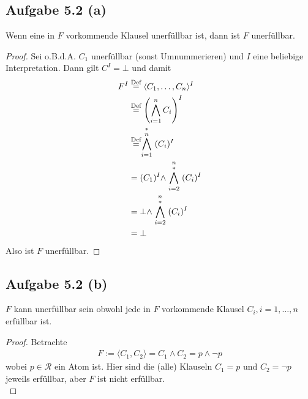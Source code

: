 \documentclass[12pt,a4paper]{article}
\newcommand{\RR}{\mathcal{R}}
\begin{document}
\subsection*{Aufgabe 5.2 (a)}
Wenn eine in $F$ vorkommende Klausel unerfüllbar ist, dann ist $F$ unerfüllbar.
\begin{proof}
Sei o.B.d.A. $C_1$ unerfüllbar (sonst Umnummerieren) und $I$ eine beliebige Interpretation. Dann gilt $C^I=\bot$ und damit
\begin{align*}
F^I
&\stackrel{\text{Def}}{=}
\langle C_1,\ldots,C_n\rangle^I\\
&\stackrel{\text{Def}}{=}
\left(\bigwedge\limits_{i=1}^n C_i\right)^I\\
&\stackrel{\text{Def}}{=}
\stackrel{\ast}{\bigwedge\limits_{i=1}^n} (C_i)^I\\
&=(C_1)^I\wedge \stackrel{n}{\bigwedge\limits_{i=2}^\ast} (C_i)^I\\
&=\bot\wedge \stackrel{n}{\bigwedge\limits_{i=2}^\ast} (C_i)^I\\
&=\bot
\end{align*}
Also ist $F$ unerfüllbar.
\end{proof}

\subsection*{Aufgabe 5.2 (b)}
$F$ kann unerfüllbar sein obwohl jede in $F$ vorkommende Klausel $C_i,i=1,\ldots,n$ erfüllbar ist.
\begin{proof}
Betrachte
\begin{align*}
F:=\langle C_1,C_2\rangle=C_1\wedge C_2=p\wedge\neg p
\end{align*}
wobei $p\in\RR$ ein Atom ist. Hier sind die (alle) Klauseln $C_1=p$ und $C_2=\neg p$  jeweils erfüllbar, aber $F$ ist nicht erfüllbar.\\
\end{proof}
\end{document}
